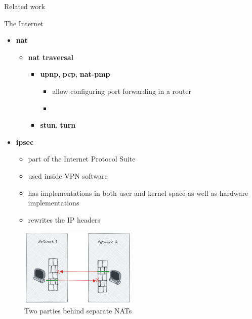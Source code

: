 \begin{frame}[fragile]{Related work}
\begin{block}{The Internet}
\begin{itemize}
\tightlist
\item
  \textbf{\acrfull{nat}}

  \begin{itemize}
  \tightlist
  \item
    \textbf{\gls{nat} traversal}

    \begin{itemize}
    \tightlist
    \item
      \textbf{\acrfull{upnp}}, \textbf{\acrfull{pcp}},
      \textbf{\acrfull{nat-pmp}}

      \begin{itemize}
      \tightlist
      \item
        allow configuring port forwarding in a router
      \item
      \end{itemize}
    \item
      \textbf{\acrfull{stun}}, \textbf{\acrfull{turn}}
    \end{itemize}
  \end{itemize}
\item
  \textbf{\acrfull{ipsec}}

  \begin{itemize}
  \tightlist
  \item
    part of the Internet Protocol Suite
  \item
    used inside VPN software
  \item
    has implementations in both user and kernel space as well as
    hardware implementations
  \item
    rewrites the IP headers
  \end{itemize}
\end{itemize}

\begin{figure}
\centering
\includegraphics[width=0.5\textwidth,height=0.25\textheight]{thesis/../figures/nat-intro.png}
\caption{Two parties behind separate NATs\label{nat-intro}}
\end{figure}


\end{block}
\end{frame}
